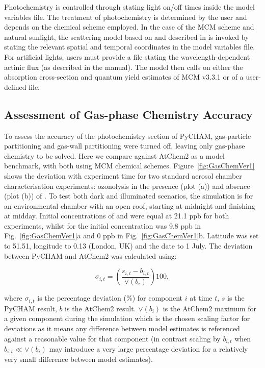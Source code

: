 \documentclass[gmd, manuscript]{copernicus}
\begin{document}
Photochemistry is controlled through stating light on/off times inside the model variables file.  The treatment of photochemistry is determined by the user and depends on the chemical scheme employed.  In the case of the MCM scheme and natural sunlight, the scattering model based on \citet{Hayman1997} and described in \citet{Saunders2003} is invoked by stating the relevant spatial and temporal coordinates in the model variables file.  For artificial lights, users must provide a file stating the wavelength-dependent actinic flux (as described in the manual).  The model then calls on either the absorption cross-section and quantum yield estimates of MCM v3.3.1 or of a user-defined file.

\subsection{Assessment of Gas-phase Chemistry Accuracy}

To assess the accuracy of the photochemistry section of PyCHAM, gas-particle partitioning and gas-wall partitioning were turned off, leaving only gas-phase chemistry to be solved.  Here we compare against AtChem2 \citep{Sommariva2018} as a model benchmark, with both using MCM chemical schemes.  Figure~\ref{fig:GasChemVer1} shows the deviation with experiment time for two standard aerosol chamber characterisation experiments:  ozonolysis in the presence (plot (a)) and absence (plot (b)) of .  To test both dark and illuminated scenarios, the simulation is for an environmental chamber with an open roof, starting at midnight and finishing at midday.  Initial concentrations of  and  were equal at 21.1 \unit{ppb} for both experiments, whilst for  the initial concentration was 9.8 \unit{ppb} in Fig.~\ref{fig:GasChemVer1}a and 0 \unit{ppb} in Fig.~\ref{fig:GasChemVer1}b.  Latitude was set to 51.51, longitude to 0.13 (London, UK) and the date to 1 July.  The deviation between PyCHAM and AtChem2 was calculated using:

\begin{equation} \label{eq:frac_dev}
\sigma_{i,t} = \left(\frac{s_{i,t}-b_{i,t}}{\lor(b_{i})}\right)100\mathrm{,}
\end{equation}

where $\sigma_{i,t}$ is the percentage deviation (\%) for component $i$ at time $t$, $s$ is the PyCHAM result, $b$ is the AtChem2 result.  $\lor(b_{i})$ is the AtChem2 maximum for a given component during the simulation which is the chosen scaling factor for deviations as it means any difference between model estimates is referenced against a reasonable value for that component (in contrast scaling by $b_{i,t}$ when $b_{i,t} \ll \lor(b_{i})$ may introduce a very large percentage deviation for a relatively very small difference between model estimates).
\end{document}
